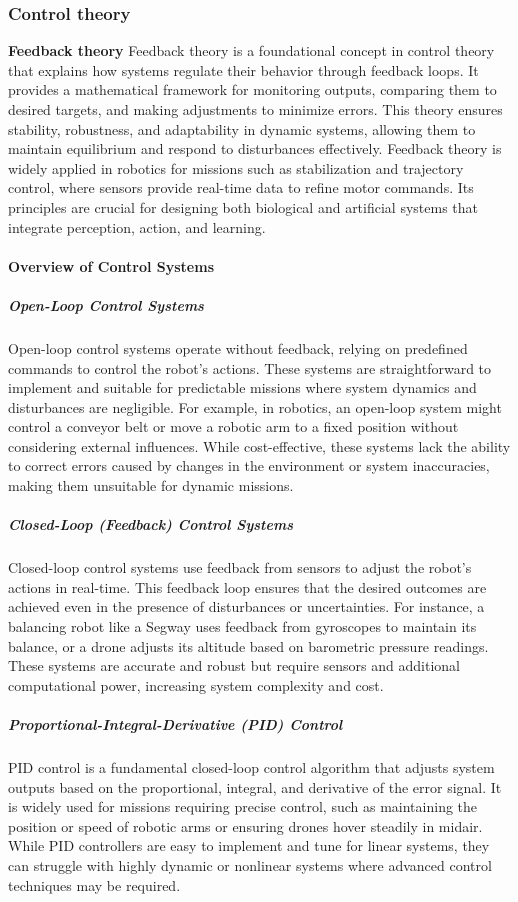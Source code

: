 \documentclass{book}
\begin{document}
\subsubsection{Control theory}
\textbf{Feedback theory}
Feedback theory is a foundational concept in control theory that explains how systems regulate their behavior through feedback loops. It provides a mathematical framework for monitoring outputs, comparing them to desired targets, and making adjustments to minimize errors. This theory ensures stability, robustness, and adaptability in dynamic systems, allowing them to maintain equilibrium and respond to disturbances effectively. Feedback theory is widely applied in robotics for missions such as stabilization and trajectory control, where sensors provide real-time data to refine motor commands. Its principles are crucial for designing both biological and artificial systems that integrate perception, action, and learning.


\paragraph{Overview of Control Systems}

\subparagraph{Open-Loop Control Systems}
Open-loop control systems operate without feedback, relying on predefined commands to control the robot's actions. These systems are straightforward to implement and suitable for predictable missions where system dynamics and disturbances are negligible. For example, in robotics, an open-loop system might control a conveyor belt or move a robotic arm to a fixed position without considering external influences. While cost-effective, these systems lack the ability to correct errors caused by changes in the environment or system inaccuracies, making them unsuitable for dynamic missions.

\subparagraph{Closed-Loop (Feedback) Control Systems}
Closed-loop control systems use feedback from sensors to adjust the robot's actions in real-time. This feedback loop ensures that the desired outcomes are achieved even in the presence of disturbances or uncertainties. For instance, a balancing robot like a Segway uses feedback from gyroscopes to maintain its balance, or a drone adjusts its altitude based on barometric pressure readings. These systems are accurate and robust but require sensors and additional computational power, increasing system complexity and cost.

\subparagraph{Proportional-Integral-Derivative (PID) Control}
PID control is a fundamental closed-loop control algorithm that adjusts system outputs based on the proportional, integral, and derivative of the error signal. It is widely used for missions requiring precise control, such as maintaining the position or speed of robotic arms or ensuring drones hover steadily in midair. While PID controllers are easy to implement and tune for linear systems, they can struggle with highly dynamic or nonlinear systems where advanced control techniques may be required.
\end{document}
